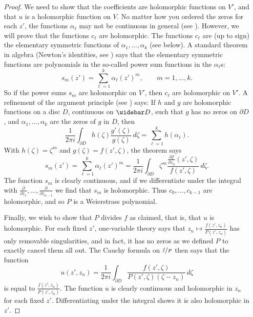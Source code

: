 \begin{proof}
We need to show that the coefficients are holomorphic functions on $V'$, and that $u$ is a holomorphic function on $V$. No matter how you ordered the zeros for each $z'$, the functions $\alpha_\ell$ may not be continuous in general (see ). However, we will prove that the functions $c_\ell$ are holomorphic. The functions $c_\ell$ are (up to sign) the elementary symmetric functions of $\alpha_1,\ldots,\alpha_k$ (see below). A standard theorem in algebra (Newton's identities, see ) says that the elementary symmetric functions are polynomials in the so-called power sum functions in the $\alpha_\ell$s:
\[
s_m(z')=\sum_{\ell=1}^k\alpha_\ell(z')^m,\qquad m=1,\ldots,k.
\]
So if the power sums $s_m$ are holomorphic on $V'$, then $c_\ell$ are holomorphic on $V'$. A refinement of the argument principle (see ) says: If $h$ and $g$ are holomorphic functions on a disc $D$, continuous on $\widebar D$, such that $g$ has no zeros on $\partial D$, and $\alpha_1,\ldots,\alpha_k$ are the zeros of $g$ in $D$, then
\[
\frac1{2\pi i}\int_{\partial D}h(\zeta)\frac{g'(\zeta)}{g(\zeta)}\,d\zeta=\sum_{\ell=1}^kh(\alpha_\ell).
\]
With $h(\zeta)=\zeta^m$ and $g(\zeta)=f(z',\zeta)$, the theorem says
\[
s_m(z')=\sum_{\ell=1}^k\alpha_\ell(z')^m=\frac1{2\pi i}\int_{\partial D}\zeta^m\frac{\frac{\partial f}{\partial z_n}(z',\zeta)}{f(z',\zeta)}\,d\zeta.
\]
The function $s_m$ is clearly continuous, and if we differentiate under the integral with $\frac\partial{\partial\bar z_1},\ldots,\frac\partial{\partial\bar z_{n-1}}$ we find that $s_m$ is holomorphic. Thus $c_0,\ldots,c_{k-1}$ are holomorphic, and so $P$ is a Weierstrass polynomial.

Finally, we wish to show that $P$ divides $f$ as claimed, that is, that $u$ is holomorphic. For each fixed $z'$, one-variable theory says that $z_n\mapsto\frac{f(z',z_n)}{P(z',z_n)}$ has only removable singularities, and in fact, it has no zeros as we defined $P$ to exactly cancel them all out. The Cauchy formula on $\nicefrac fP$ then says that the function
\[
u(z',z_n)=\frac1{2\pi i}\int_{\partial D}\frac{f(z',\zeta)}{P(z',\zeta)(\zeta-z_n)}\,d\zeta
\]
is equal to $\frac{f(z',z_n)}{P(z',z_n)}$. The function $u$ is clearly continuous and holomorphic in $z_n$ for each fixed $z'$. Differentiating under the integral shows it is also holomorphic in $z'$.
\end{proof}
